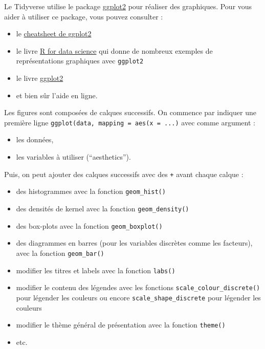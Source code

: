 \documentclass[
]{book}
\providecommand{\tightlist}{%
  \setlength{\itemsep}{0pt}\setlength{\parskip}{0pt}}
\begin{document}
Le Tidyverse utilise le package \href{https://ggplot2.tidyverse.org/articles/ggplot2.html}{ggplot2} pour réaliser des graphiques. Pour vous aider à utiliser ce package, vous pouvez consulter :

\begin{itemize}
\tightlist
\item
  le \href{https://posit.co/wp-content/uploads/2022/10/data-visualization-1.pdf}{cheatsheet de ggplot2}
\item
  le livre \href{https://r4ds.hadley.nz/}{R for data science} qui donne de nombreux exemples de représentations graphiques avec \texttt{ggplot2}
\item
  le livre \href{https://ggplot2-book.org/}{ggplot2}
\item
  et bien sûr l'aide en ligne.
\end{itemize}

Les figures sont composées de calques successifs. On commence par indiquer une première ligne \texttt{ggplot(data,\ mapping\ =\ aes(x\ =\ ...)} avec comme argument :

\begin{itemize}
\tightlist
\item
  les données,
\item
  les variables à utiliser (``aesthetics'').
\end{itemize}

Puis, on peut ajouter des calques successifs avec des \texttt{+} avant chaque calque :

\begin{itemize}
\tightlist
\item
  des histogrammes avec la fonction \texttt{geom\_hist()}
\item
  des densités de kernel avec la fonction \texttt{geom\_density()}
\item
  des box-plots avec la fonction \texttt{geom\_boxplot()}
\item
  des diagrammes en barres (pour les variables discrètes comme les facteurs), avec la fonction \texttt{geom\_bar()}
\item
  modifier les titres et labels avec la fonction \texttt{labs()}
\item
  modifier le contenu des légendes avec les fonctions \texttt{scale\_colour\_discrete()} pour légender les couleurs ou encore \texttt{scale\_shape\_discrete} pour légender les couleurs
\item
  modifier le thème général de présentation avec la fonction \texttt{theme()}
\item
  etc.
\end{itemize}
\end{document}
